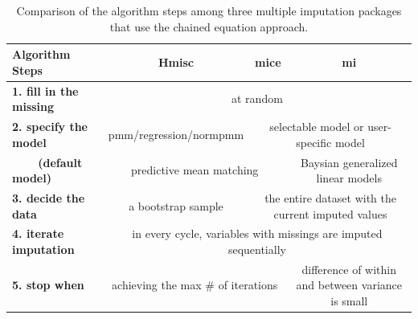 \documentclass[article]{jss}
\begin{document}
\begin{center}
\begin{table}[h]
\begin{centering}
\begin{tabular}{l|c|c|c}
\hline 
\textbf{\scriptsize{Algorithm Steps}} & \textbf{\scriptsize{Hmisc}} & \textbf{\scriptsize{mice}} & \textbf{\scriptsize{mi}}\tabularnewline
\hline 
\textbf{\scriptsize{1. fill in the missing}} & \multicolumn{3}{c}{{\scriptsize{at random}}}\tabularnewline
\hline 
\textbf{\scriptsize{2. specify the model}} & {\scriptsize{pmm/regression/normpmm}} & \multicolumn{2}{c}{{\scriptsize{selectable model or user-specific model}}}\tabularnewline
\hline 
\textbf{\scriptsize{~~~~(default model)}} & \multicolumn{2}{c|}{{\scriptsize{predictive mean matching}}} & {\scriptsize{Baysian generalized linear models}}\tabularnewline
\hline 
\textbf{\scriptsize{3. decide the data}} & {\scriptsize{a bootstrap sample}} & \multicolumn{2}{c}{{\scriptsize{the entire dataset with the current imputed values}}}\tabularnewline
\hline 
\textbf{\scriptsize{4. iterate imputation}} & \multicolumn{3}{c}{{\scriptsize{in every cycle, variables with missings are imputed sequentially}}}\tabularnewline
\hline 
\textbf{\scriptsize{5. stop when}} & \multicolumn{2}{c|}{{\scriptsize{achieving the max \# of iterations}}} & {\scriptsize{difference of within and between variance is small}}\tabularnewline
\hline 
\end{tabular}
\par\end{centering}
\caption{Comparison of the algorithm steps among three multiple imputation packages that use the chained equation approach.}
\label{tab:compare-mi}
\end{table}
\par\end{center}
\end{document}
